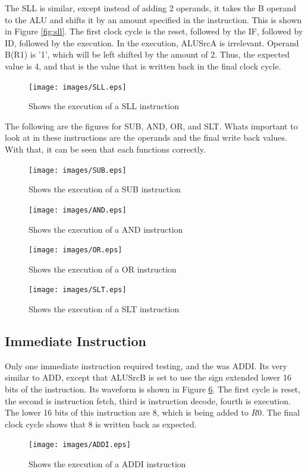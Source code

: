 \documentclass[12pt, a4paper]{article}
\begin{document}
The SLL is similar, except instead of adding 2 operands, it takes the B operand to the ALU
and shifts it by an amount specified in the instruction. This is shown in Figure \ref{fig:sll}.
The first clock cycle is the reset, followed by the IF, followed by ID, followed by the execution.
In the execution, ALUSrcA is irrelevant. Operand B(R1) is '1', which will be left shifted by the amount
of 2. Thus, the expected value is 4, and that is the value that is written back in the final clock cycle.

\begin{figure}[H]
  \centering
  \texttt{[image: images/SLL.eps]}
  \caption{Shows the execution of a SLL instruction}
  \label{fig:ssl}
\end{figure}

The following are the figures for SUB, AND, OR, and SLT. Whats important to look at in these instructions
are the operands and the final write back values. With that, it can be seen that each functions correctly.

\begin{figure}[H]
  \centering
  \texttt{[image: images/SUB.eps]}
  \caption{Shows the execution of a SUB instruction}
  \label{fig:sub}
\end{figure}

\begin{figure}[H]
  \centering
  \texttt{[image: images/AND.eps]}
  \caption{Shows the execution of a AND instruction}
  \label{fig:and}
\end{figure}

\begin{figure}[H]
  \centering
  \texttt{[image: images/OR.eps]}
  \caption{Shows the execution of a OR instruction}
  \label{fig:or}
\end{figure}

\begin{figure}[H]
  \centering
  \texttt{[image: images/SLT.eps]}
  \caption{Shows the execution of a SLT instruction}
  \label{fig:slt}
\end{figure}

\subsection{Immediate Instruction}
Only one immediate instruction required testing, and the was ADDI. Its very similar to ADD, except
that ALUSrcB is set to use the sign extended lower 16 bits of the instruction. Its waveform is shown
in Figure \ref{fig:addi}. The first cycle is reset, the second is instruction fetch, third is instruction
decode, fourth is execution. The lower 16 bits of this instruction are 8, which is being added to
$R0$. The final clock cycle shows that 8 is written back as expected.
\begin{figure}[H]
  \centering
  \texttt{[image: images/ADDI.eps]}
  \caption{Shows the execution of a ADDI instruction}
  \label{fig:addi}
\end{figure}
\end{document}
